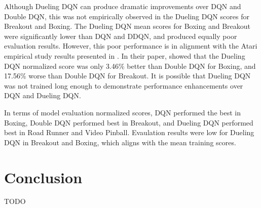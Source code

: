 \documentclass{article}
\begin{document}
Although Dueling DQN can produce dramatic improvements over DQN and Double DQN,
this was not empirically observed in the Dueling DQN scores for Breakout and
Boxing. The Dueling DQN mean scores for Boxing and Breakout were significantly
lower than DQN and DDQN, and produced equally poor evaluation results.  However,
this poor performance is in alignment with the Atari empirical study results
presented in \cite{wang2016dueling}. In their paper, \cite{wang2016dueling}
showed that the Dueling DQN normalized score was only 3.46\% better than Double
DQN for Boxing, and 17.56\% worse than Double DQN for Breakout. It is possible
that Dueling DQN was not trained long enough to demonstrate performance
enhancements over DQN and Dueling DQN.

In terms of model evaluation normalized scores, DQN performed the best in
Boxing, Double DQN performed best in Breakout, and Dueling DQN performed best in
Road Runner and Video Pinball. Evaulation results were low for Dueling DQN in
Breakout and Boxing, which aligns with the mean training scores.

\section{Conclusion}
TODO


\end{document}
